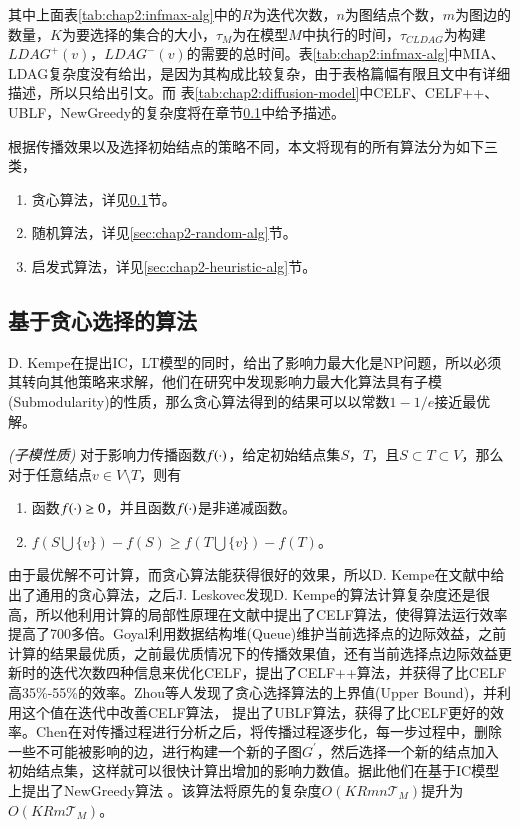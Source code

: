 其中上面表\ref{tab:chap2:infmax-alg}中的$R$为迭代次数，$n$为图结点个数，$m$为图边的数量，$K$为要选择的集合的大小，$\tau_{M}$为在模型$M$中执行的时间，$\tau_{CLDAG}$为构建$LDAG^{+}(v)$，$LDAG^{-}(v)$的需要的总时间\cite{he2012influence}。表\ref{tab:chap2:infmax-alg}中MIA、LDAG复杂度没有给出，是因为其构成比较复杂，由于表格篇幅有限且文中有详细描述，所以只给出引文。而
表\ref{tab:chap2:diffusion-model}中CELF、CELF++、UBLF，NewGreedy的复杂度将在章节\ref{sec:chap2-greedy-alg}中给予描述。


根据传播效果以及选择初始结点的策略不同，本文将现有的所有算法分为如下三类，
\begin{enumerate}
\item 贪心算法，详见\ref{sec:chap2-greedy-alg}节。
\item 随机算法，详见\ref{sec:chap2-random-alg}节。
\item 启发式算法，详见\ref{sec:chap2-heuristic-alg}节。
\end{enumerate}



\subsection{基于贪心选择的算法}
\label{sec:chap2-greedy-alg}
D. Kempe\cite{kempe2003maximizing}在提出IC，LT模型的同时，给出了影响力最大化是NP问题，所以必须其转向其他策略来求解，他们在研究中发现影响力最大化算法具有子模(Submodularity)的性质，那么贪心算法得到的结果可以以常数$1-1/e$接近最优解。
\begin{definition}
\emph{(子模性质)}
对于影响力传播函数$f(\boldmath\cdot)$，给定初始结点集$S$，$T$，且$S \subset T \subset V$，那么对于任意结点$v \in V\setminus T$，则有
\begin{enumerate}
\item 函数$f(\boldmath\cdot) \geq 0$，并且函数$f(\boldmath\cdot)$是非递减函数。
\item $f(S \bigcup \{v\}) -  f(S) \geq f(T \bigcup \{v\}) -  f(T)$。
\end{enumerate}
\end{definition}


由于最优解不可计算，而贪心算法能获得很好的效果，所以D. Kempe在文献\cite{kempe2003maximizing}中给出了通用的贪心算法，之后J. Leskovec发现D. Kempe的算法计算复杂度还是很高，所以他利用计算的局部性原理在文献\cite{leskovec2007cost}中提出了CELF算法，使得算法运行效率提高了700多倍。Goyal\cite{goyal2011celf++}利用数据结构堆(Queue)维护当前选择点的边际效益，之前计算的结果最优质，之前最优质情况下的传播效果值，还有当前选择点边际效益更新时的迭代次数四种信息来优化CELF，提出了CELF++算法，并获得了比CELF高35\%-55\%的效率。Zhou\cite{zhou2013ublf}等人发现了贪心选择算法的上界值(Upper Bound)，并利用这个值在迭代中改善CELF算法， 提出了UBLF算法，获得了比CELF更好的效率。Chen\cite{chen2009efficient}在对传播过程进行分析之后，将传播过程逐步化，每一步过程中，删除一些不可能被影响的边，进行构建一个新的子图$G^{'}$，然后选择一个新的结点加入初始结点集，这样就可以很快计算出增加的影响力数值。据此他们在基于IC模型上提出了NewGreedy算法
。该算法将原先的复杂度$O(KRmn\mathcal{T}_{M})$提升为$O(KRm\mathcal{T}_{M})$。


